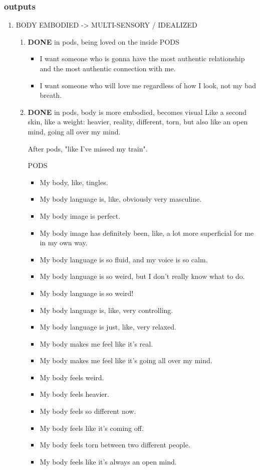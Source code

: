 \documentclass[11pt]{article}
\begin{document}
\subsubsection{outputs}
\label{sec:org8d53d07}
\begin{enumerate}
\item BODY EMBODIED -> MULTI-SENSORY / IDEALIZED
\label{sec:orgdd2197e}
\begin{enumerate}
\item {\bfseries\sffamily DONE} in pods, being loved on the inside
\label{sec:org9436eed}
PODS
\begin{itemize}
\item I want someone who is gonna have the most authentic relationship and the most authentic connection with me.
\item I want someone who will love me regardless of how I look, not my bad breath.
\end{itemize}

\item {\bfseries\sffamily DONE} in pods, body is more embodied, becomes visual
\label{sec:orgbb8eac8}
Like a second skin, like a weight: heavier, reality, different, torn,
but also like an open mind, going all over my mind.

After pods, "like I've missed my train".

PODS
\begin{itemize}
\item My body, like, tingles.
\item My body language is, like, obviously very masculine.
\item My body image is perfect.
\item My body image has definitely been, like, a lot more superficial for
me in my own way.
\item My body language is so fluid, and my voice is so calm.
\item My body language is so weird, but I don't really know what to do.
\item My body language is so weird!
\item My body language is, like, very controlling.
\item My body language is just, like, very relaxed.
\item My body makes me feel like it's real.
\item My body makes me feel like it's going all over my mind.
\item My body feels weird.
\item My body feels heavier.
\item My body feels so different now.
\item My body feels like it's coming off.
\item My body feels torn between two different people.
\item My body feels like it's always an open mind.
\end{itemize}


\end{enumerate}
\end{enumerate}
\end{document}
